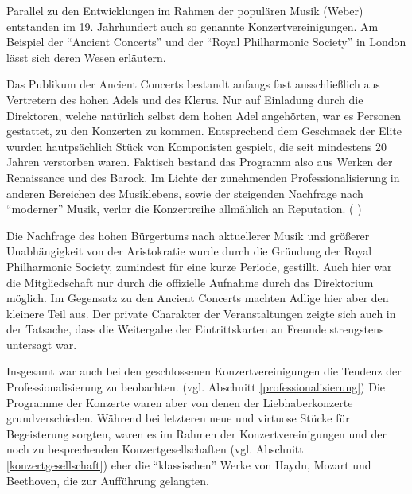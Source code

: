 \documentclass[a4paper, german, oneside]{scrbook}
\begin{document}
Parallel zu den Entwicklungen im Rahmen der populären Musik (Weber) entstanden im 19. Jahrhundert auch so genannte Konzertvereinigungen. Am Beispiel der \enquote{Ancient Concerts} und der \enquote{Royal Philharmonic Society} in London lässt sich deren Wesen erläutern.

Das Publikum der Ancient Concerts bestandt anfangs fast ausschließlich aus Vertretern des hohen Adels und des Klerus. Nur auf Einladung durch die Direktoren, welche natürlich selbst dem hohen Adel angehörten, war es Personen gestattet, zu den Konzerten zu kommen. Entsprechend dem Geschmack der Elite wurden hautpsächlich Stück von Komponisten gespielt, die seit mindestens 20 Jahren verstorben waren. Faktisch bestand das Programm also aus Werken der Renaissance und des Barock. Im Lichte der zunehmenden Professionalisierung in anderen Bereichen des Musiklebens, sowie der steigenden Nachfrage nach \enquote{moderner} Musik, verlor die Konzertreihe allmählich an Reputation. (\cite[92ff.;]{muller_publikum_2014} \cite[73]{weber_music_2004})

Die Nachfrage des hohen Bürgertums nach aktuellerer Musik und größerer Unabhängigkeit von der Aristokratie wurde durch die Gründung der Royal Philharmonic Society, zumindest für eine kurze Periode, gestillt. Auch hier war die Mitgliedschaft nur durch die offizielle Aufnahme durch das Direktorium möglich. Im Gegensatz zu den Ancient Concerts machten Adlige hier aber den kleinere Teil aus. Der private Charakter der Veranstaltungen zeigte sich auch in der Tatsache, dass die Weitergabe der Eintrittskarten an Freunde strengstens untersagt war. \parencite[93]{muller_publikum_2014}

Insgesamt war auch bei den geschlossenen Konzertvereinigungen die Tendenz der Professionalisierung zu beobachten. (vgl. Abschnitt \ref{professionalisierung}) Die Programme der Konzerte waren aber von denen der Liebhaberkonzerte grundverschieden. Während bei letzteren neue und virtuose Stücke für Begeisterung sorgten, waren es im Rahmen der Konzertvereinigungen und der noch zu besprechenden Konzertgesellschaften (vgl. Abschnitt \ref{konzertgesellschaft}) eher die \enquote{klassischen} Werke von Haydn, Mozart und Beethoven, die zur Aufführung gelangten. \parencite[22f]{weber_music_2004}
\end{document}
